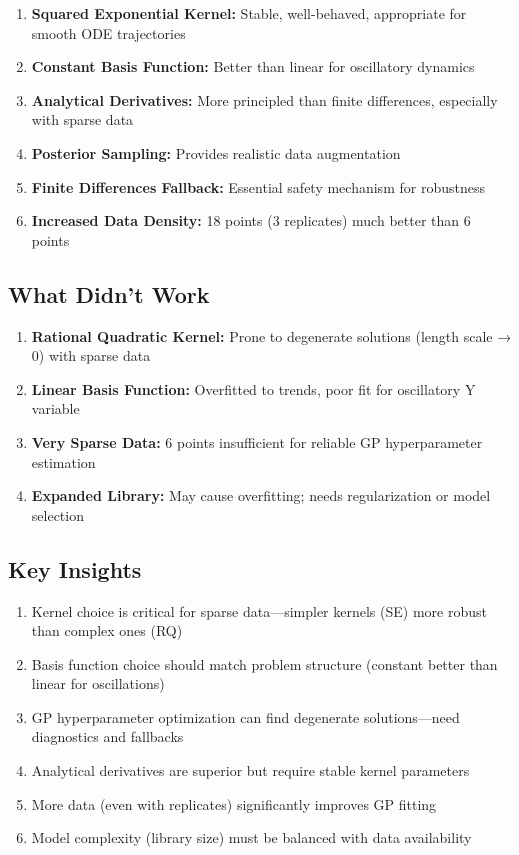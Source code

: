 \documentclass[11pt]{article}
\begin{document}
\begin{enumerate}
    \item \textbf{Squared Exponential Kernel:} Stable, well-behaved, appropriate for smooth ODE trajectories
    \item \textbf{Constant Basis Function:} Better than linear for oscillatory dynamics
    \item \textbf{Analytical Derivatives:} More principled than finite differences, especially with sparse data
    \item \textbf{Posterior Sampling:} Provides realistic data augmentation
    \item \textbf{Finite Differences Fallback:} Essential safety mechanism for robustness
    \item \textbf{Increased Data Density:} 18 points (3 replicates) much better than 6 points
\end{enumerate}

\subsection{What Didn't Work}

\begin{enumerate}
    \item \textbf{Rational Quadratic Kernel:} Prone to degenerate solutions (length scale → 0) with sparse data
    \item \textbf{Linear Basis Function:} Overfitted to trends, poor fit for oscillatory Y variable
    \item \textbf{Very Sparse Data:} 6 points insufficient for reliable GP hyperparameter estimation
    \item \textbf{Expanded Library:} May cause overfitting; needs regularization or model selection
\end{enumerate}

\subsection{Key Insights}

\begin{enumerate}
    \item Kernel choice is critical for sparse data—simpler kernels (SE) more robust than complex ones (RQ)
    \item Basis function choice should match problem structure (constant better than linear for oscillations)
    \item GP hyperparameter optimization can find degenerate solutions—need diagnostics and fallbacks
    \item Analytical derivatives are superior but require stable kernel parameters
    \item More data (even with replicates) significantly improves GP fitting
    \item Model complexity (library size) must be balanced with data availability
\end{enumerate}
\end{document}
